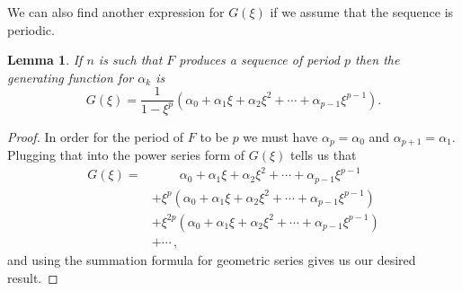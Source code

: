 \documentclass[12pt]{article}
\newtheorem{lemma}{Lemma}
\begin{document}
We can also find another expression for $G(\xi)$ if we assume that the sequence is periodic. 
\begin{lemma} If $n$ is such that $F$ produces a sequence of period $p$ then the generating function for $\alpha_k$ is 
\begin{equation*}
G(\xi) = \frac{1}{1- \xi^p} (\alpha_0 + \alpha_1 \xi + \alpha_2 \xi^2 + \cdots + \alpha_{p-1} \xi^{p-1}).
\end{equation*}
\end{lemma}
\begin{proof}
In order for the period of $F$ to be $p$ we must have $\alpha_p= \alpha_0$ and $\alpha_{p+1} = \alpha_1$. Plugging that into the power series form of $G(\xi)$ tells us that
\begin{align*}
G(\xi) =&  \qquad \> \alpha_0 + \alpha_1 \xi + \alpha_2 \xi^2 + \cdots + \alpha_{p-1} \xi^{p-1} \\
 &+ \xi^p(\alpha_0 + \alpha_1 \xi + \alpha_2 \xi^2 + \cdots + \alpha_{p-1} \xi^{p-1}) \\ 
 &+ \xi^{2p}(\alpha_0 + \alpha_1 \xi + \alpha_2 \xi^2 + \cdots + \alpha_{p-1} \xi^{p-1}) \\ 
 &+ \cdots \, ,
\end{align*}
and using the summation formula for geometric series gives us our desired result.
\end{proof}
\end{document}

